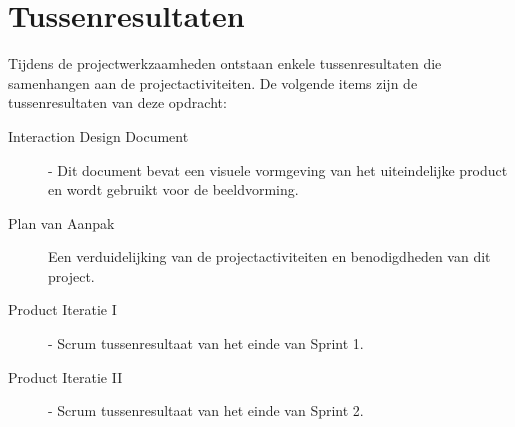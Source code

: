 \chapter{Tussenresultaten}
Tijdens de projectwerkzaamheden ontstaan enkele tussenresultaten die samenhangen aan de projectactiviteiten. De volgende items zijn de tussenresultaten van deze opdracht:

\begin{description}
  \item[Interaction Design Document]- Dit document bevat een visuele vormgeving van het uiteindelijke product en wordt gebruikt voor de beeldvorming.
  \item[Plan van Aanpak] Een verduidelijking van de projectactiviteiten en benodigdheden van dit project.
  \item[Product Iteratie I]- Scrum tussenresultaat van het einde van Sprint 1.
  \item[Product Iteratie II]- Scrum tussenresultaat van het einde van Sprint 2.
\end{description}


